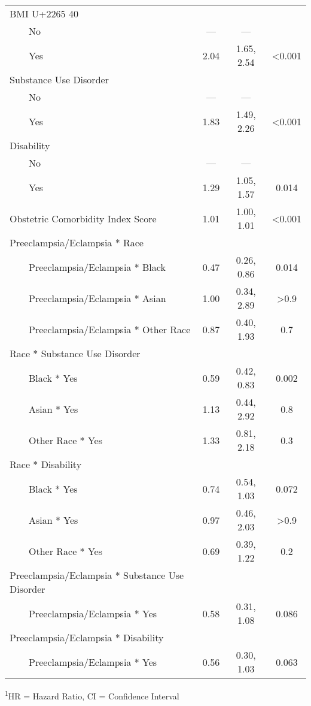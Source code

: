 \begin{longtable}{lccc}
BMI U+2265 40 &  &  &  \\ 
    No & — & — &  \\ 
    Yes & 2.04 & 1.65, 2.54 & <0.001 \\ 
Substance Use Disorder &  &  &  \\ 
    No & — & — &  \\ 
    Yes & 1.83 & 1.49, 2.26 & <0.001 \\ 
Disability &  &  &  \\ 
    No & — & — &  \\ 
    Yes & 1.29 & 1.05, 1.57 & 0.014 \\ 
Obstetric Comorbidity Index Score & 1.01 & 1.00, 1.01 & <0.001 \\ 
Preeclampsia/Eclampsia * Race &  &  &  \\ 
    Preeclampsia/Eclampsia * Black & 0.47 & 0.26, 0.86 & 0.014 \\ 
    Preeclampsia/Eclampsia * Asian & 1.00 & 0.34, 2.89 & >0.9 \\ 
    Preeclampsia/Eclampsia * Other Race & 0.87 & 0.40, 1.93 & 0.7 \\ 
Race * Substance Use Disorder &  &  &  \\ 
    Black * Yes & 0.59 & 0.42, 0.83 & 0.002 \\ 
    Asian * Yes & 1.13 & 0.44, 2.92 & 0.8 \\ 
    Other Race * Yes & 1.33 & 0.81, 2.18 & 0.3 \\ 
Race * Disability &  &  &  \\ 
    Black * Yes & 0.74 & 0.54, 1.03 & 0.072 \\ 
    Asian * Yes & 0.97 & 0.46, 2.03 & >0.9 \\ 
    Other Race * Yes & 0.69 & 0.39, 1.22 & 0.2 \\ 
Preeclampsia/Eclampsia * Substance Use Disorder &  &  &  \\ 
    Preeclampsia/Eclampsia * Yes & 0.58 & 0.31, 1.08 & 0.086 \\ 
Preeclampsia/Eclampsia * Disability &  &  &  \\ 
    Preeclampsia/Eclampsia * Yes & 0.56 & 0.30, 1.03 & 0.063 \\ 
\bottomrule
\end{longtable}
\begin{minipage}{\linewidth}
\textsuperscript{1}HR = Hazard Ratio, CI = Confidence Interval\\
\end{minipage}

